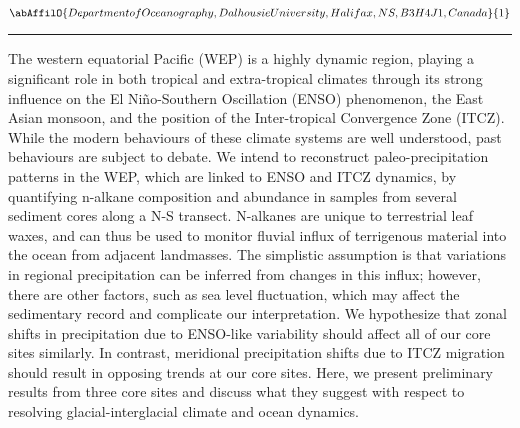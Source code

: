 \begin{center}
   \vspace{2 mm} \begin{center}
    \vspace{2 mm}\begin{center}
  
  $\abAffilO{Department of Oceanography, Dalhousie University, Halifax, NS, B3H 4J1, Canada}{1}$

  \end{center}
  \vspace{2 mm}
  \end{center}\end{center}
  \begin{center}\rule{0.70\linewidth}{0.5 pt}\end{center}

\noindent The western equatorial Pacific (WEP) is a highly dynamic region, playing a significant role in both tropical and extra-tropical climates through its strong influence on the El Niño-Southern Oscillation (ENSO) phenomenon, the East Asian monsoon, and the position of the Inter-tropical Convergence Zone (ITCZ).  While the modern behaviours of these climate systems are well understood, past behaviours are subject to debate.  We intend to reconstruct paleo-precipitation patterns in the WEP, which are linked to ENSO and ITCZ dynamics, by quantifying n-alkane composition and abundance in samples from several sediment cores along a N-S transect.  N-alkanes are unique to terrestrial leaf waxes, and can thus be used to monitor fluvial influx of terrigenous material into the ocean from adjacent landmasses.  The simplistic assumption is that variations in regional precipitation can be inferred from changes in this influx; however, there are other factors, such as sea level fluctuation, which may affect the sedimentary record and complicate our interpretation.  We hypothesize that zonal shifts in precipitation due to ENSO-like variability should affect all of our core sites similarly.  In contrast, meridional precipitation shifts due to ITCZ migration should result in opposing trends at our core sites.  Here, we present preliminary results from three core sites and discuss what they suggest with respect to resolving glacial-interglacial climate and ocean dynamics.           

